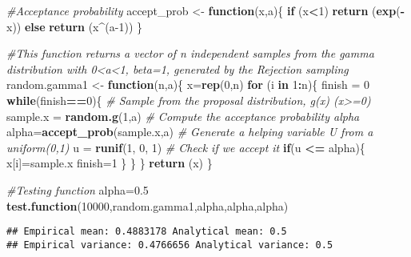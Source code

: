 \documentclass[]{article}
\newenvironment{Shaded}{\begin{snugshade}}{\end{snugshade}}
\newcommand{\CommentTok}[1]{\textcolor[rgb]{0.56,0.35,0.01}{\textit{#1}}}
\newcommand{\ControlFlowTok}[1]{\textcolor[rgb]{0.13,0.29,0.53}{\textbf{#1}}}
\newcommand{\DecValTok}[1]{\textcolor[rgb]{0.00,0.00,0.81}{#1}}
\newcommand{\FloatTok}[1]{\textcolor[rgb]{0.00,0.00,0.81}{#1}}
\newcommand{\KeywordTok}[1]{\textcolor[rgb]{0.13,0.29,0.53}{\textbf{#1}}}
\newcommand{\NormalTok}[1]{#1}
\newcommand{\OperatorTok}[1]{\textcolor[rgb]{0.81,0.36,0.00}{\textbf{#1}}}
\newcommand{\StringTok}[1]{\textcolor[rgb]{0.31,0.60,0.02}{#1}}
\begin{document}
\begin{Shaded}
\begin{Highlighting}[]
\CommentTok{#Acceptance probability}
\NormalTok{accept_prob <-}\StringTok{ }\ControlFlowTok{function}\NormalTok{(x,a)\{ }
  \ControlFlowTok{if}\NormalTok{ (x}\OperatorTok{<}\DecValTok{1}\NormalTok{)}
      \KeywordTok{return}\NormalTok{ (}\KeywordTok{exp}\NormalTok{(}\OperatorTok{-}\NormalTok{x))}
    \ControlFlowTok{else} 
      \KeywordTok{return}\NormalTok{ (x}\OperatorTok{^}\NormalTok{(a}\DecValTok{-1}\NormalTok{))}
\NormalTok{\}}
\end{Highlighting}
\end{Shaded}

\begin{Shaded}
\begin{Highlighting}[]
\CommentTok{#This function returns a vector of n independent samples from the gamma distribution with 0<a<1, beta=1, generated by the Rejection sampling}
\NormalTok{random.gamma1 <-}\StringTok{ }\ControlFlowTok{function}\NormalTok{(n,a)\{ }
\NormalTok{  x=}\KeywordTok{rep}\NormalTok{(}\DecValTok{0}\NormalTok{,n)}
  \ControlFlowTok{for}\NormalTok{ (i }\ControlFlowTok{in} \DecValTok{1}\OperatorTok{:}\NormalTok{n)\{}
\NormalTok{    finish =}\StringTok{ }\DecValTok{0}
    \ControlFlowTok{while}\NormalTok{(finish}\OperatorTok{==}\DecValTok{0}\NormalTok{)\{  }
      \CommentTok{# Sample from the proposal distribution, g(x) (x>=0)}
\NormalTok{      sample.x =}\StringTok{ }\KeywordTok{random.g}\NormalTok{(}\DecValTok{1}\NormalTok{,a)}
      \CommentTok{# Compute the acceptance probability alpha}
\NormalTok{      alpha=}\KeywordTok{accept_prob}\NormalTok{(sample.x,a)}
      \CommentTok{# Generate a helping variable U from a uniform(0,1)}
\NormalTok{      u =}\StringTok{ }\KeywordTok{runif}\NormalTok{(}\DecValTok{1}\NormalTok{, }\DecValTok{0}\NormalTok{, }\DecValTok{1}\NormalTok{)}
      \CommentTok{# Check if we accept it}
      \ControlFlowTok{if}\NormalTok{(u }\OperatorTok{<=}\StringTok{ }\NormalTok{alpha)\{}
\NormalTok{        x[i]=sample.x}
\NormalTok{        finish=}\DecValTok{1}
\NormalTok{      \}}
\NormalTok{    \}}
\NormalTok{  \}}
  \KeywordTok{return}\NormalTok{ (x)}
\NormalTok{\}}

\CommentTok{#Testing function}
\NormalTok{alpha=}\FloatTok{0.5}
\KeywordTok{test.function}\NormalTok{(}\DecValTok{10000}\NormalTok{,random.gamma1,alpha,alpha,alpha)}
\end{Highlighting}
\end{Shaded}

\begin{verbatim}
## Empirical mean: 0.4883178 Analytical mean: 0.5 
## Empirical variance: 0.4766656 Analytical variance: 0.5
\end{verbatim}
\end{document}
